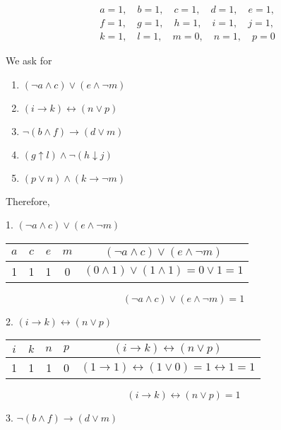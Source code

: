 \documentclass[12pt,a4paper,openany]{article}
\begin{document}
\[
\begin{aligned}
&a = 1, \quad b = 1, \quad c = 1, \quad d = 1, \quad e = 1, \\
&f = 1, \quad g = 1, \quad h = 1, \quad i = 1, \quad j = 1, \\
&k = 1, \quad l = 1, \quad m = 0, \quad n = 1, \quad p = 0
\end{aligned}
\]

We ask for
\begin{enumerate}
  \item \((\neg a \land c) \lor (e \land \neg m)\)
  \item \((i \to k) \leftrightarrow (n \lor p)\)
  \item \(\neg(b \land f) \to (d \lor m)\)
  \item \((g \uparrow l) \land \neg(h \downarrow j)\)
  \item \((p \lor n) \land (k \to \neg m)\)
\end{enumerate}

Therefore,

{1. } $(\neg a \land c) \lor (e \land \neg m)$

\begin{center}
\begin{tabular}{|c|c|c|c||c|}
\hline
$a$ & $c$ & $e$ & $m$ & $(\neg a \land c) \lor (e \land \neg m)$ \\
\hline
1 & 1 & 1 & 0 & $(0 \land 1) \lor (1 \land 1) = 0 \lor 1 = 1$ \\
\hline
\end{tabular}
\end{center}

\[
\boxed{(\neg a \land c) \lor (e \land \neg m) = 1}
\]



{2. } $(i \to k) \leftrightarrow (n \lor p)$

\begin{center}
\begin{tabular}{|c|c|c|c||c|}
\hline
$i$ & $k$ & $n$ & $p$ & $(i \to k) \leftrightarrow (n \lor p)$ \\
\hline
1 & 1 & 1 & 0 & $(1 \to 1) \leftrightarrow (1 \lor 0) = 1 \leftrightarrow 1 = 1$ \\
\hline
\end{tabular}
\end{center}

\[
\boxed{(i \to k) \leftrightarrow (n \lor p) = 1}
\]



{3. } $\neg(b \land f) \to (d \lor m)$
\end{document}
